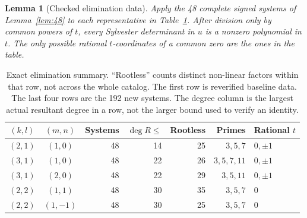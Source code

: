 \documentclass[11pt]{article}
\newtheorem{lemma}[theorem]{Lemma}
\theoremstyle{definition}\newtheorem{definition}[theorem]{Definition}
\theoremstyle{remark}\newtheorem{remark}[theorem]{Remark}
\begin{document}
\begin{lemma}[Checked elimination data]\label{lem:degree4data}
Apply the 48 complete signed systems of Lemma~\ref{lem:48} to each representative in Table~\ref{tab:degree4}. After division only by common powers of $t$, every Sylvester determinant in $u$ is a nonzero polynomial in $t$. The only possible rational $t$-coordinates of a common zero are the ones in the table.
\end{lemma}
\begin{table}[ht]
\centering\small
\setlength{\tabcolsep}{5pt}\renewcommand{\arraystretch}{1.18}
\begin{tabular}{ccrrrrl}
\toprule
$(k,l)$ & $(m,n)$ & Systems & $\deg R\le$ & Rootless & Primes & Rational $t$\\
\midrule
$(2,1)$ & $(1,0)$  & 48 & 14 & 25 & $3,5,7$ & $0,\pm1$\\
$(3,1)$ & $(1,0)$  & 48 & 22 & 26 & $3,5,7,11$ & $0,\pm1$\\
$(3,1)$ & $(2,0)$  & 48 & 22 & 29 & $3,5,11$ & $0,\pm1$\\
$(2,2)$ & $(1,1)$  & 48 & 30 & 35 & $3,5,7$ & $0$\\
$(2,2)$ & $(1,-1)$ & 48 & 30 & 25 & $3,5,7$ & $0$\\
\bottomrule
\end{tabular}
\caption{Exact elimination summary. ``Rootless'' counts distinct non-linear factors within that row, not across the whole catalog. The first row is reverified baseline data. The last four rows are the 192 new systems. The degree column is the largest actual resultant degree in a row, not the larger bound used to verify an identity.}\label{tab:degree4}
\end{table}
\end{document}

